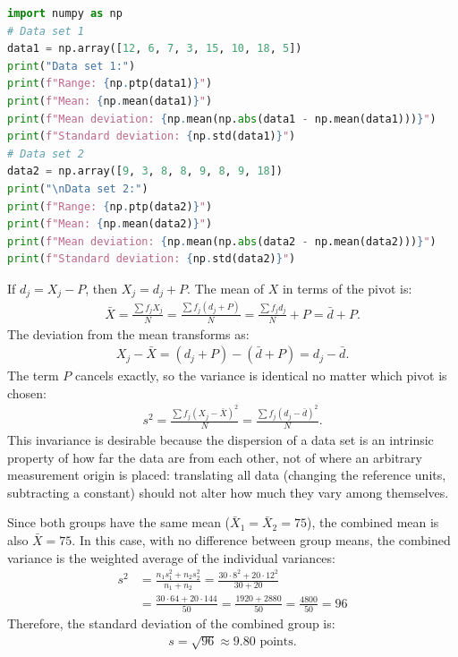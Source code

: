 \begin{lstlisting}[language=Python]
import numpy as np
# Data set 1
data1 = np.array([12, 6, 7, 3, 15, 10, 18, 5])
print("Data set 1:")
print(f"Range: {np.ptp(data1)}")
print(f"Mean: {np.mean(data1)}")
print(f"Mean deviation: {np.mean(np.abs(data1 - np.mean(data1)))}")
print(f"Standard deviation: {np.std(data1)}")
# Data set 2
data2 = np.array([9, 3, 8, 8, 9, 8, 9, 18])
print("\nData set 2:")
print(f"Range: {np.ptp(data2)}")
print(f"Mean: {np.mean(data2)}")
print(f"Mean deviation: {np.mean(np.abs(data2 - np.mean(data2)))}")
print(f"Standard deviation: {np.std(data2)}")
\end{lstlisting}

\begin{solproblema}[prob:c5833ad]
	If $d_j = X_j - P$, then $X_j = d_j + P$. The mean of $X$ in terms of the pivot is:
	\begin{align}
		\bar{X} = \frac{\sum f_j X_j}{N} = \frac{\sum f_j (d_j + P)}{N} = \frac{\sum f_j d_j}{N} + P = \bar{d} + P.
	\end{align}
	The deviation from the mean transforms as:
	\begin{align}
		X_j - \bar{X} = (d_j + P) - (\bar{d} + P) = d_j - \bar{d}.
	\end{align}
	The term $P$ cancels exactly, so the variance is identical no matter which pivot is chosen:
	\begin{align}
		s^2 = \frac{\sum f_j (X_j - \bar{X})^2}{N} = \frac{\sum f_j (d_j - \bar{d})^2}{N}.
	\end{align}
	This invariance is desirable because the dispersion of a data set is an intrinsic property of how far the data are from each other, not of where an arbitrary measurement origin is placed: translating all data (changing the reference units, subtracting a constant) should not alter how much they vary among themselves.
\end{solproblema}

\begin{solproblema}[prob:d87f55c]
	Since both groups have the same mean ($\bar{X}_1 = \bar{X}_2 = 75$), the combined mean is also $\bar{X} = 75$. In this case, with no difference between group means, the combined variance is the weighted average of the individual variances:
	\begin{align}
		s^2 &= \frac{n_1 s_1^2 + n_2 s_2^2}{n_1 + n_2} = \frac{30 \cdot 8^2 + 20 \cdot 12^2}{30 + 20} \\
		&= \frac{30 \cdot 64 + 20 \cdot 144}{50} = \frac{1920 + 2880}{50} = \frac{4800}{50} = 96
	\end{align}
	Therefore, the standard deviation of the combined group is:
	\begin{align}
		s = \sqrt{96} \approx 9.80 \text{ points.}
	\end{align}
\end{solproblema}


